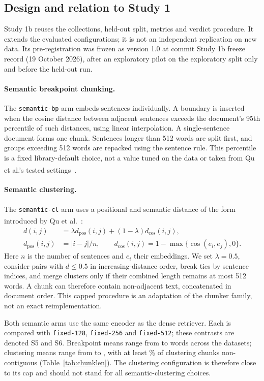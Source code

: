 \documentclass[11pt]{article}
\newcommand{\chunk}[1]{\texttt{#1}}
\newcommand{\citeL}[1]{\cite{#1}\textsuperscript{\textcolor{red}{\dag}}}
\begin{document}
\subsection{Design and relation to Study 1}
Study 1b reuses the collections, held-out split, metrics and verdict procedure. It extends the evaluated
configurations; it is not an independent replication on new data. Its pre-registration was frozen as version 1.0 at
commit Study 1b freeze record (19 October 2026), after an exploratory pilot on the exploratory split only and before the
held-out run.

\paragraph{Semantic breakpoint chunking.}
The \chunk{semantic-bp} arm embeds sentences individually. A boundary is inserted when the cosine distance between
adjacent sentences exceeds the document's 95th percentile of such distances, using linear interpolation. A
single-sentence document forms one chunk. Sentences longer than 512 words are split first, and groups exceeding 512
words are repacked using the sentence rule. This percentile is a fixed library-default choice, not a value tuned on
the data or taken from Qu et al.'s tested settings~\citeL{qu2025semanticchunking}.

\paragraph{Semantic clustering.}
The \chunk{semantic-cl} arm uses a positional and semantic distance of the form introduced by Qu et
al.~\citeL{qu2025semanticchunking}:
\begin{align}
 d(i,j)&=\lambda d_{\mathrm{pos}}(i,j)+(1-\lambda)d_{\mathrm{cos}}(i,j),\\
 d_{\mathrm{pos}}(i,j)&=|i-j|/n,\qquad
 d_{\mathrm{cos}}(i,j)=1-\max\{\cos(e_i,e_j),0\}.
\end{align}
Here $n$ is the number of sentences and $e_i$ their embeddings. We set $\lambda=0.5$, consider pairs with $d\leq0.5$
in increasing-distance order, break ties by sentence indices, and merge clusters only if their combined length
remains at most 512 words. A chunk can therefore contain non-adjacent text, concatenated in document order. This
capped procedure is an adaptation of the chunker family, not an exact reimplementation.

Both semantic arms use the same encoder as the dense retriever. Each is compared with \chunk{fixed-128},
\chunk{fixed-256} and \chunk{fixed-512}; these contrasts are denoted S5 and S6. Breakpoint means range from \SemBpMin{}
to \SemBpMax{} words across the datasets; clustering means range from \SemClMin{} to \SemClMax, with at least
\SemClNoncontigMin\% of clustering chunks non-contiguous (Table~\ref{tab:chunklen}). The clustering configuration is
therefore close to its cap and should not stand for all semantic-clustering choices.
\end{document}

